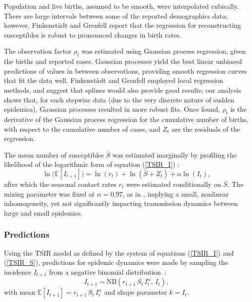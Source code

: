 \documentclass[10pt]{article}
\begin{document}
Population and live births, assumed to be smooth, were interpolated cubically. There are large intervals between some of the reported demographics data; however, Finkenst\"{a}dt and Grenfell \cite{Finkenstadt2000} report that the regression for reconstructing susceptibles is robust to pronounced changes in birth rates.

The observation factor $\rho_t$ was estimated using Gaussian process regression, given the births and reported cases. Gaussian processes yield the best linear unbiased predictions of values in between observations, providing smooth regression curves that fit the data well. Finkenst\"{a}dt and Grenfell \cite{Finkenstadt2000} employed local regression methods, and suggest that splines would also provide good results; our analysis shows that, for such stepwise data (due to the very discrete nature of sudden epidemics), Gaussian processes resulted in more robust fits. Once found, $\rho_t$ is the derivative of the Gaussian process regression for the cumulative number of births, with respect to the cumulative number of cases, and $Z_t$ are the residuals of the regression.

The mean number of susceptibles $\bar{S}$ was estimated marginally by profiling the likelihood of the logarithmic form of equation (\ref{TSIR_I}) :
\begin{equation}
\ln\big(\mathbb{E}\left[I_{t+1}\right]\big) = \ln(r_t) + \ln\left(\bar{S} + Z_t\right) + \alpha \ln\left(I_t\right),
\label{log}
\end{equation}
after which the seasonal contact rates $r_t$ were estimated conditionally on $\bar{S}$. The mixing parameter was fixed at $\alpha = 0.97$, as in \cite{Metcalf2010}, implying a small, nonlinear inhomogeneity, yet not significantly impacting transmission dynamics between large and small epidemics. 







\subsubsection*{Predictions}

Using the TSIR model as defined by the system of equations (\ref{TSIR_I}) and (\ref{TSIR_S}), predictions for epidemic dynamics were made by sampling the incidence $I_{t+1}$ from a negative binomial distribution~:
\begin{equation}
I_{t+1} \sim \mathrm{NB}\left(r_{t+1}\,S_t\,I_t^\alpha, \, I_t\right),
\end{equation}
with mean $\mathbb{E}\left[I_{t+1}\right] = r_{t+1} \, S_t \, I_t^\alpha$ and shape parameter $k = I_t$.
\end{document}
